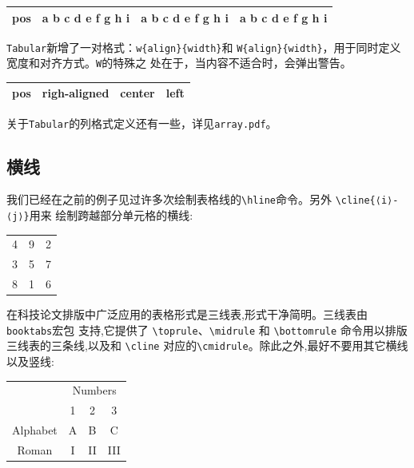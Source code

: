 \documentclass{article}
\begin{document}
\newcommand{\txt}{a b c d e f g h i}

\begin{table}[H]  \centering
  \begin{tabular}{cp{2em}m{2em}b{2em}}
    \hline
    pos & \txt & \txt  & \txt \\ \hline
  \end{tabular}
\end{table}

\texttt{Tabular}新增了一对格式：\verb!w{align}{width}!和
\verb!W{align}{width}!，用于同时定义宽度和对齐方式。\texttt{W}的特殊之
处在于，当内容不适合时，会弹出警告。

\begin{table}[H]
  \centering
  \begin{tabular}{|c|w{r}{6em}|w{c}{6em}|W{l}{2em}|} \hline pos &
    righ-aligned & center & left \\ \hline
  \end{tabular}
\end{table}

关于\texttt{Tabular}的列格式定义还有一些，详见\texttt{array.pdf}。

\subsection{横线}

我们已经在之前的例子见过许多次绘制表格线的\verb!\hline!命令。另外 \verb!\cline{⟨i⟩-⟨j⟩}!用来
绘制跨越部分单元格的横线:  

\begin{table}[h!]
  \centering
  \begin{tabular}{|*{3}{c|}}
    \hline
    4 & 9 & 2 \\ \cline{2-3}
    3 & 5 & 7 \\ \cline{1-1}
    8 & 1 & 6 \\ \hline
  \end{tabular}
\end{table}

在科技论文排版中广泛应用的表格形式是三线表,形式干净简明。三线表由\texttt{booktabs}宏包
支持,它提供了 \verb!\toprule!、\verb!\midrule! 和 \verb!\bottomrule! 命令用以排版三线表的三条线,以及和
\verb!\cline! 对应的\verb!\cmidrule!。除此之外,最好不要用其它横线以及竖线:

\begin{table}[H]
  \centering
  \begin{tabular}{cccc}
    \toprule
    & \multicolumn{3}{c}{Numbers} \\
    \cmidrule{2-4}
    & 1 & 2 & 3 \\
    \midrule
    Alphabet & A & B & C \\
    Roman & I & II& III \\
    \bottomrule
  \end{tabular}
\end{table}
\end{document}
